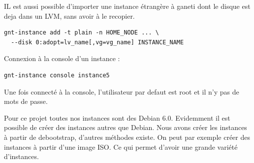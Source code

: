 IL est aussi possible d'importer une instance étrangère à ganeti dont le disque est deja dans un LVM, sans avoir à le recopier.

\begin{lstlisting}
gnt-instance add -t plain -n HOME_NODE ... \
  --disk 0:adopt=lv_name[,vg=vg_name] INSTANCE_NAME
\end{lstlisting}

Connexion à la console d'un instance :
\begin{lstlisting}
gnt-instance console instance5
\end{lstlisting}
Une fois connecté à la console, l'utilisateur par defaut est root et il n'y pas de mots de passe.

Pour ce projet toutes nos instances sont des Debian 6.0.
Evidemment il est possible de créer des instances autres que Debian. Nous avons créer les instances à partir de debootstrap, d'autres méthodes existe.
On peut par exemple créer des instances à partir d'une image ISO. Ce qui permet d'avoir une grande variété d'instances.